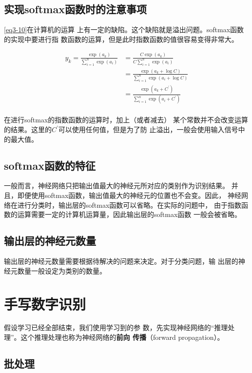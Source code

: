 \subsection{实现softmax函数时的注意事项}
\autoref{eq3-10}在计算机的运算
上有一定的缺陷。这个缺陷就是溢出问题。softmax函数的实现中要进行指
数函数的运算，但是此时指数函数的值很容易变得非常大。

\begin{equation}
    \begin{aligned}
        y_k=\frac{\exp(a_k)}{\sum\limits_{i=1}^n{\exp(a_i)}} & =\frac{C\exp(a_k)}{C\sum\limits_{i=1}^n{\exp(a_i)}}             \\
                                                             & =\frac{\exp(a_k+\log C)}{\sum\limits_{i=1}^n{\exp(a_i+\log C)}} \\
                                                             & =\frac{\exp(a_k+C^{'})}{\sum\limits_{i=1}^n{\exp(a_i+C^{'})}}   \\
    \end{aligned}
\end{equation}

在进行softmax的指数函数的运算时，加上（或者减去）
某个常数并不会改变运算的结果。这里的$C^{'}$可以使用任何值，但是为了防
止溢出，一般会使用输入信号中的最大值。
\subsection{softmax函数的特征}
一般而言，神经网络只把输出值最大的神经元所对应的类别作为识别结果。
并且，即便使用softmax函数，输出值最大的神经元的位置也不会变。因此，
神经网络在进行分类时，输出层的softmax函数可以省略。在实际的问题中，
由于指数函数的运算需要一定的计算机运算量，因此输出层的softmax函数
一般会被省略。
\subsection{输出层的神经元数量}
输出层的神经元数量需要根据待解决的问题来决定。对于分类问题，输
出层的神经元数量一般设定为类别的数量。
\section{手写数字识别}
假设学习已经全部结束，我们使用学习到的参
数，先实现神经网络的“推理处理”。这个推理处理也称为神经网络的\textbf{前向
    传播}（forward propagation）。

\subsection{批处理}

